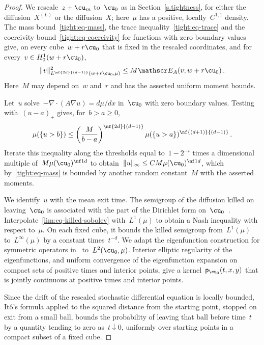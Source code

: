 \documentclass[11pt]{amsart}
\begin{document}
\begin{proof}
We rescale~$z+\cu_m$ to~$\cu_0$ as in Section~\ref{s.tightness}, for either the diffusion~$X^{(L)}$ or the diffusion~$X$; here~$\mu$ has a positive, locally~$C^{1,1}$ density. The mass bound~\eqref{tight:eq-mass}, the trace inequality~\eqref{tight:eq-trace} and the coercivity bound~\eqref{tight:eq-coercivity} for functions with zero boundary values give, on every cube~$w+r\cu_0$ that is fixed in the rescaled coordinates, and for every~$v\in H_0^1(w+r\cu_0)$,
\begin{equation}
	\|v\|_{L^{\nf{2d}{(d-1)}}(w+r\cu_0,\mu)}^2\leq M\mathscr E_A(v;w+r\cu_0)
	\,.
	\label{lim:eq-killed-sobolev}
\end{equation}
Here~$M$ may depend on~$w$ and~$r$ and has the asserted uniform moment bounds.

\smallskip

Let~$u$ solve~$-\nabla\cdot(A\nabla u)=d\mu/dx$ in~$\cu_0$ with zero boundary values. Testing with~$(u-a)_+$ gives, for~$b>a\geq0$,
\begin{equation*}
	\mu(\{u>b\})\leq\left(\frac M{b-a}\right)^{\nf{2d}{(d-1)}}\mu(\{u>a\})^{\nf{(d+1)}{(d-1)}}\,.
\end{equation*}
Iterate this inequality along the thresholds equal to~$1-2^{-i}$ times a dimensional multiple of~$M\mu(\cu_0)^{\nf1d}$ to obtain~$\|u\|_\infty\leq CM\mu(\cu_0)^{\nf1d}$, which by~\eqref{tight:eq-mass} is bounded by another random constant~$M$ with the asserted moments.

\smallskip

We identify~$u$ with the mean exit time. The semigroup of the diffusion killed on leaving~$\cu_0$ is associated with the part of the Dirichlet form on~$\cu_0$~\citep[Theorems~4.4.2--4.4.3]{FOT}. Interpolate~\eqref{lim:eq-killed-sobolev} with~$L^1(\mu)$ to obtain a Nash inequality with respect to~$\mu$. On each fixed cube, it bounds the killed semigroup from~$L^1(\mu)$ to~$L^\infty(\mu)$ by a constant times~$t^{-d}$. We adapt the eigenfunction construction for symmetric operators in~\citet[Chapter~VII, Section~6, Theorem~6.3 and Proposition~6.4]{Bass} to~$L^2(\cu_0,\mu)$. Interior elliptic regularity of the eigenfunctions, and uniform convergence of the eigenfunction expansion on compact sets of positive times and interior points, give a kernel~$\mathsf p_{\cu_0}(t,x,y)$ that is jointly continuous at positive times and interior points.

\smallskip

Since the drift of the rescaled stochastic differential equation is locally bounded, It\^o's formula applied to the squared distance from the starting point, stopped on exit from a small ball, bounds the probability of leaving that ball before time~$t$ by a quantity tending to zero as~$t\downarrow0$, uniformly over starting points in a compact subset of a fixed cube.


\end{proof}
\end{document}
